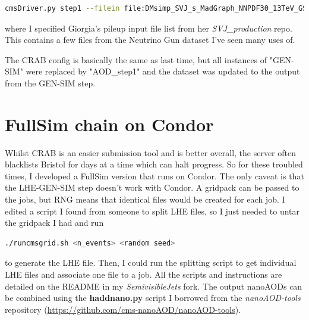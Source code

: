 \begin{lstlisting}[belowskip=-0.7cm, language=sh, numbers=none]
cmsDriver.py step1 --filein file:DMsimp_SVJ_s_MadGraph_NNPDF30_13TeV_GS.root --fileout file:DMsimp_SVJ_s_MadGraph_NNPDF30_13TeV_AOD_step1.root --pileup_input filelist:~/Semi-visible_jets/SVJ_production/global/pileup_filelist.txt --mc --eventcontent PREMIXRAW --datatier GEN-SIM-RAW --conditions 80X_mcRun2_asymptotic_2016_TrancheIV_v6 --step DIGIPREMIX_S2,DATAMIX,L1,DIGI2RAW,HLT:@frozen2016 --datamix PreMix --era Run2_2016 --python_filename DMsimp_SVJ_s_MadGraph_NNPDF_13TeV_AOD_step1.py --no_exec --customise Configuration/DataProcessing/Utils.addMonitoring -n 50000
\end{lstlisting}

where I specified Giorgia's pileup input file list from her \emph{SVJ\_production} repo. This contains a few files from the Neutrino Gun dataset I've seen many uses of.

The CRAB config is basically the same as last time, but all instances of "GEN-SIM" were replaced by "AOD\_step1" and the dataset was updated to the output from the GEN-SIM step.




\section{FullSim chain on Condor}

Whilst CRAB is an easier submission tool and is better overall, the server often blacklists Bristol for days at a time which can halt progress. So for these troubled times, I developed a FullSim version that runs on Condor. The only caveat is that the LHE-GEN-SIM step doesn't work with Condor. A gridpack can be passed to the jobs, but RNG means that identical files would be created for each job. I edited a script I found from someone to split LHE files, so I just needed to untar the gridpack I had and run

\begin{lstlisting}[belowskip=-0.7cm, language=sh, numbers=none]
./runcmsgrid.sh <n_events> <random seed>
\end{lstlisting}

to generate the LHE file. Then, I could run the splitting script to get individual LHE files and associate one file to a job. All the scripts and instructions are detailed on the README in my \emph{SemivisibleJets} fork. The output nanoAODs can be combined using the \textbf{haddnano.py} script I borrowed from the \emph{nanoAOD-tools} repository (\url{https://github.com/cms-nanoAOD/nanoAOD-tools}).

